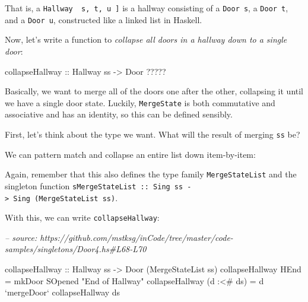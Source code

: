 \documentclass[]{article}
\newenvironment{Shaded}{}{}
\newcommand{\CommentTok}[1]{\textcolor[rgb]{0.38,0.63,0.69}{\textit{#1}}}
\newcommand{\DataTypeTok}[1]{\textcolor[rgb]{0.56,0.13,0.00}{#1}}
\newcommand{\FunctionTok}[1]{\textcolor[rgb]{0.02,0.16,0.49}{#1}}
\newcommand{\NormalTok}[1]{#1}
\newcommand{\OtherTok}[1]{\textcolor[rgb]{0.00,0.44,0.13}{#1}}
\newcommand{\StringTok}[1]{\textcolor[rgb]{0.25,0.44,0.63}{#1}}
\begin{document}
That is, a \texttt{Hallway\ \textquotesingle{}{[}\ s,\ t,\ u\ {]}} is a hallway
consisting of a \texttt{Door\ s}, a \texttt{Door\ t}, and a \texttt{Door\ u},
constructed like a linked list in Haskell.

Now, let's write a function to \emph{collapse all doors in a hallway down to a
single door}:

\begin{Shaded}
\begin{Highlighting}[]
\OtherTok{collapseHallway ::} \DataTypeTok{Hallway}\NormalTok{ ss }\OtherTok{->} \DataTypeTok{Door} \FunctionTok{?????}
\end{Highlighting}
\end{Shaded}

Basically, we want to merge all of the doors one after the other, collapsing it
until we have a single door state. Luckily, \texttt{MergeState} is both
commutative and associative and has an identity, so this can be defined
sensibly.

First, let's think about the type we want. What will the result of merging
\texttt{ss} be?

We can pattern match and collapse an entire list down item-by-item:

\begin{Shaded}
\end{Shaded}

Again, remember that this also defines the type family \texttt{MergeStateList}
and the singleton function
\texttt{sMergeStateList\ ::\ Sing\ ss\ -\textgreater{}\ Sing\ (MergeStateList\ ss)}.

With this, we can write \texttt{collapseHallway}:

\begin{Shaded}
\begin{Highlighting}[]
\CommentTok{-- source: https://github.com/mstksg/inCode/tree/master/code-samples/singletons/Door4.hs#L68-L70}

\OtherTok{collapseHallway ::} \DataTypeTok{Hallway}\NormalTok{ ss }\OtherTok{->} \DataTypeTok{Door}\NormalTok{ (}\DataTypeTok{MergeStateList}\NormalTok{ ss)}
\NormalTok{collapseHallway }\DataTypeTok{HEnd}       \FunctionTok{=}\NormalTok{ mkDoor }\DataTypeTok{SOpened} \StringTok{"End of Hallway"}
\NormalTok{collapseHallway (d }\FunctionTok{:<#}\NormalTok{ ds) }\FunctionTok{=}\NormalTok{ d }\OtherTok{`mergeDoor`}\NormalTok{ collapseHallway ds}
\end{Highlighting}
\end{Shaded}
\end{document}
